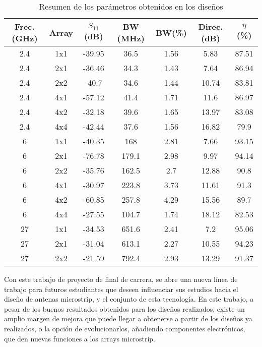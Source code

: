 \begin{table}
\centering
\small
\begin{tabular}{c c c c c c c}
\toprule[\heavyrulewidth]\toprule[\heavyrulewidth]
\hline

\textbf{Frec. (GHz)} &\textbf{ Array} & \textbf{$S_{11}$ (dB)}  & \textbf{BW (MHz)} &\textbf{ BW(\%)} & \textbf{Direc. (dB)} & \textbf{$\eta$ (\%)} \\
\midrule
2.4 & 1x1 & -39.95 & 36.5 & 1.56 & 5.83 & 87.51 \\ 
2.4 & 2x1 & -36.46 & 34.3 & 1.43 & 7.64 & 86.94 \\ 
2.4 & 2x2 & -40.7 & 34.6 & 1.44 & 10.74 & 83.81 \\ 
2.4 & 4x1 & -57.12 & 41.4 & 1.71 & 11.6 & 86.97 \\ 
2.4 & 4x2 & -32.18 & 39.6 & 1.65 & 13.97 & 83.08 \\ 
2.4 & 4x4 & -42.44 & 37.6 & 1.56 & 16.82 & 79.9 \\ 
6 & 1x1 & -40.35 & 168 & 2.81 & 7.66 & 93.15 \\ 
6 & 2x1 & -76.78 & 179.1 & 2.98 & 9.97 & 94.14 \\ 
6 & 2x2 & -35.76 & 162.5 & 2.7 & 12.88 & 90.8 \\ 
6 & 4x1 & -30.97 & 223.8 & 3.73 & 11.61 & 91.3 \\ 
6 & 4x2 & -60.85 & 257.8 & 4.29 & 15.56 & 89.7 \\ 
6 & 4x4 & -27.55 & 104.7 & 1.74 & 18.12 & 82.53 \\ 
27 & 1x1 & -34.53 & 651.6 & 2.41 & 7.2 & 95.06 \\ 
27 & 2x1 & -31.04 & 613.1 & 2.27 & 10.55 & 94.23 \\ 
27 & 2x2 & -21.59 & 792.4 & 2.93 & 13.29 & 91.37 \\ 
   \bottomrule[\heavyrulewidth]

\end{tabular}

   \caption{Resumen de los parámetros obtenidos en los diseños}
   \label{tab:final}
\end{table}
\par Con este trabajo de proyecto de final de carrera, se abre una nueva línea de trabajo para futuros estudiantes que deseen influenciar sus estudios hacia el diseño de antenas microstrip, y el conjunto de esta tecnología. En este trabajo, a pesar de los buenos resultados obtenidos para los diseños realizados, existe un amplio margen de mejora que puede llegar a obtenerse a partir de los diseños ya realizados, o la opción de evolucionarlos, añadiendo componentes electrónicos, que den nuevas funciones a los arrays microstrip.
